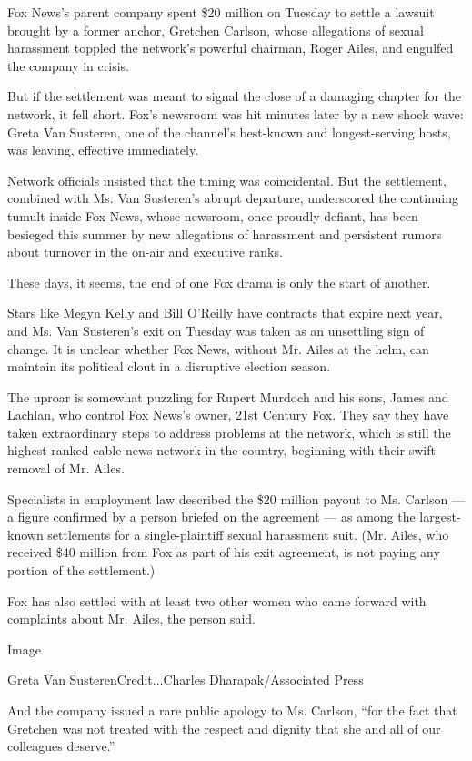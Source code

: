Fox News's parent company spent \$20 million on Tuesday to settle a
lawsuit brought by a former anchor, Gretchen Carlson, whose allegations
of sexual harassment toppled the network's powerful chairman, Roger
Ailes, and engulfed the company in crisis.

But if the settlement was meant to signal the close of a damaging
chapter for the network, it fell short. Fox's newsroom was hit minutes
later by a new shock wave: Greta Van Susteren, one of the channel's
best-known and longest-serving hosts, was leaving, effective
immediately.

Network officials insisted that the timing was coincidental. But the
settlement, combined with Ms. Van Susteren's abrupt departure,
underscored the continuing tumult inside Fox News, whose newsroom, once
proudly defiant, has been besieged this summer by new allegations of
harassment and persistent rumors about turnover in the on-air and
executive ranks.

These days, it seems, the end of one Fox drama is only the start of
another.

Stars like Megyn Kelly and Bill O'Reilly have contracts that expire next
year, and Ms. Van Susteren's exit on Tuesday was taken as an unsettling
sign of change. It is unclear whether Fox News, without Mr. Ailes at the
helm, can maintain its political clout in a disruptive election season.

The uproar is somewhat puzzling for Rupert Murdoch and his sons, James
and Lachlan, who control Fox News's owner, 21st Century Fox. They say
they have taken extraordinary steps to address problems at the network,
which is still the highest-ranked cable news network in the country,
beginning with their swift removal of Mr. Ailes.

Specialists in employment law described the \$20 million payout to Ms.
Carlson --- a figure confirmed by a person briefed on the agreement ---
as among the largest-known settlements for a single-plaintiff sexual
harassment suit. (Mr. Ailes, who received \$40 million from Fox as part
of his exit agreement, is not paying any portion of the settlement.)

Fox has also settled with at least two other women who came forward with
complaints about Mr. Ailes, the person said.

Image

Greta Van SusterenCredit...Charles Dharapak/Associated Press

And the company issued a rare public apology to Ms. Carlson, ``for the
fact that Gretchen was not treated with the respect and dignity that she
and all of our colleagues deserve.''

